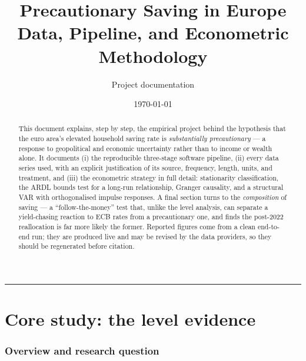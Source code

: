 \documentclass[11pt,a4paper]{article}
\title{\textbf{Precautionary Saving in Europe}\\[2pt]
       \large Data, Pipeline, and Econometric Methodology}
\author{Project documentation}
\date{\today}
\begin{document}
\maketitle
\thispagestyle{empty}

\begin{abstract}
\noindent
This document explains, step by step, the empirical project behind the
hypothesis that the euro area's elevated household saving rate is
\emph{substantially precautionary} --- a response to geopolitical and economic
uncertainty rather than to income or wealth alone. It documents (i) the
reproducible three-stage software pipeline, (ii) every data series used, with an
explicit justification of its source, frequency, length, units, and treatment,
and (iii) the econometric strategy in full detail: stationarity classification,
the ARDL bounds test for a long-run relationship, Granger causality, and a
structural VAR with orthogonalised impulse responses. A final section turns to
the \emph{composition} of saving --- a ``follow-the-money'' test that, unlike the
level analysis, can separate a yield-chasing reaction to ECB rates from a
precautionary one, and finds the post-2022 reallocation is far more likely the
former. Reported figures come from a clean end-to-end run; they are produced live
and may be revised by the data providers, so they should be regenerated before
citation.
\end{abstract}

\tableofcontents
\bigskip
\hrule
\bigskip


\clearpage
\part{Core study: the level evidence}

\section{Overview and research question}
\end{document}
